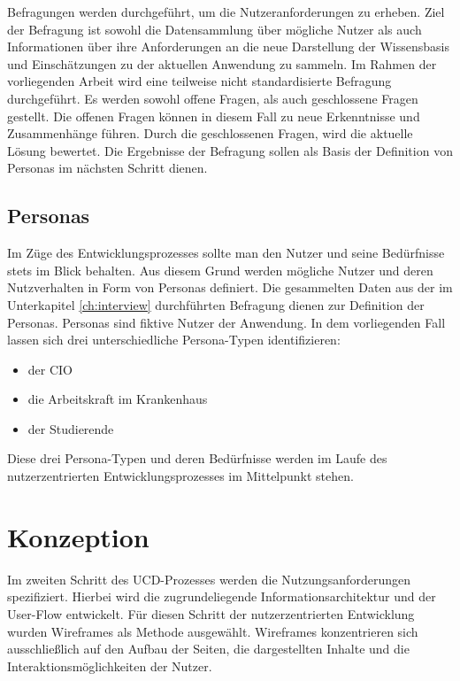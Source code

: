 Befragungen werden durchgeführt, um die Nutzeranforderungen zu erheben.
Ziel der Befragung ist sowohl die Datensammlung über mögliche Nutzer als auch Informationen über ihre Anforderungen an die neue Darstellung der Wissensbasis und Einschätzungen zu der aktuellen Anwendung zu sammeln. 
Im Rahmen der vorliegenden Arbeit wird eine teilweise nicht standardisierte Befragung durchgeführt.
Es werden sowohl offene Fragen, als auch geschlossene Fragen gestellt.
Die offenen Fragen können in diesem Fall zu neue Erkenntnisse und Zusammenhänge führen.
Durch die geschlossenen Fragen, wird die aktuelle Lösung bewertet.
Die Ergebnisse der Befragung sollen als Basis der Definition von Personas im nächsten Schritt dienen.

\subsection{Personas}

Im Züge des Entwicklungsprozesses sollte man den Nutzer und seine Bedürfnisse stets im Blick behalten.
Aus diesem Grund werden mögliche Nutzer und deren Nutzverhalten in Form von Personas definiert.
Die gesammelten Daten aus der im Unterkapitel \ref{ch:interview} durchführten Befragung dienen zur Definition der Personas.
Personas sind fiktive Nutzer der Anwendung.
In dem vorliegenden Fall lassen sich drei unterschiedliche Persona-Typen identifizieren:

\begin{itemize}
	\item der \ac{CIO}
	\item die Arbeitskraft im Krankenhaus
	\item der Studierende
\end{itemize}

Diese drei Persona-Typen und deren Bedürfnisse werden im Laufe des nutzerzentrierten Entwicklungsprozesses im Mittelpunkt stehen.

\section{Konzeption}\label{sec:concept}

Im zweiten Schritt des \ac{UCD}-Prozesses werden die Nutzungsanforderungen spezifiziert.
Hierbei wird die zugrundeliegende Informationsarchitektur und der User-Flow entwickelt.
Für diesen Schritt der nutzerzentrierten Entwicklung wurden Wireframes als Methode ausgewählt.
Wireframes konzentrieren sich ausschließlich auf den Aufbau der Seiten, die dargestellten Inhalte und die Interaktionsmöglichkeiten der Nutzer.


